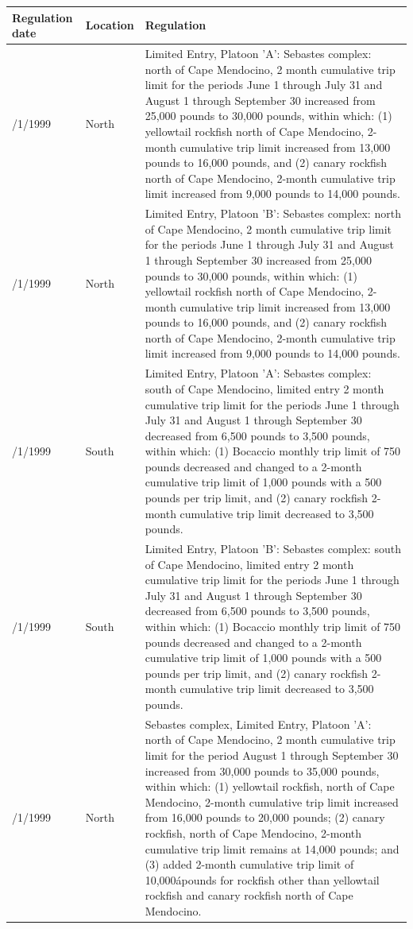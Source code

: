 \documentclass[12pt,]{article}
\begin{document}
\begin{tabular}{>{\centering}p{.60in}>{\centering}p{1.0in}>{\raggedright}p{4.20in}}
  \hline
Regulation date & Location & Regulation \\ 
  \hline
6/1/1999 & 4030 North & Limited Entry, Platoon 'A': Sebastes complex: north of Cape Mendocino, 2 month cumulative trip limit for the periods June 1 through July 31 and August 1 through September 30 increased from 25,000 pounds to 30,000 pounds, within which: (1) yellowtail rockfish north of Cape Mendocino, 2-month cumulative trip limit increased from 13,000 pounds to 16,000 pounds, and (2) canary rockfish north of Cape Mendocino, 2-month cumulative trip limit increased from 9,000 pounds to 14,000 pounds. \\ 
  6/1/1999 & 4030 North & Limited Entry, Platoon 'B': Sebastes complex: north of Cape Mendocino, 2 month cumulative trip limit for the periods June 1 through July 31 and August 1 through September 30 increased from 25,000 pounds to 30,000 pounds, within which: (1) yellowtail rockfish north of Cape Mendocino, 2-month cumulative trip limit increased from 13,000 pounds to 16,000 pounds, and (2) canary rockfish north of Cape Mendocino, 2-month cumulative trip limit increased from 9,000 pounds to 14,000 pounds. \\ 
  6/1/1999 & 4030 South & Limited Entry, Platoon 'A':  Sebastes complex: south of Cape Mendocino, limited entry 2 month cumulative trip limit for the periods June 1 through July 31 and August 1 through September 30 decreased from 6,500 pounds to 3,500 pounds, within which: (1) Bocaccio monthly trip limit of 750 pounds decreased and changed to a 2-month cumulative trip limit of 1,000 pounds with a 500 pounds per trip limit, and (2) canary rockfish 2-month cumulative trip limit decreased to 3,500 pounds. \\ 
  6/1/1999 & 4030 South & Limited Entry, Platoon 'B':  Sebastes complex: south of Cape Mendocino, limited entry 2 month cumulative trip limit for the periods June 1 through July 31 and August 1 through September 30 decreased from 6,500 pounds to 3,500 pounds, within which: (1) Bocaccio monthly trip limit of 750 pounds decreased and changed to a 2-month cumulative trip limit of 1,000 pounds with a 500 pounds per trip limit, and (2) canary rockfish 2-month cumulative trip limit decreased to 3,500 pounds. \\ 
  8/1/1999 & 4030 North & Sebastes complex, Limited Entry, Platoon 'A': north of Cape Mendocino, 2 month cumulative trip limit for the period August 1 through September 30 increased from 30,000 pounds to 35,000 pounds, within which: (1) yellowtail rockfish, north of Cape Mendocino, 2-month cumulative trip limit increased from 16,000 pounds to 20,000 pounds; (2) canary rockfish, north of Cape Mendocino, 2-month cumulative trip limit remains at 14,000 pounds; and (3) added 2-month cumulative trip limit of 10,000ápounds for rockfish other than yellowtail rockfish and canary rockfish north of Cape Mendocino. \\ 

\end{tabular}
\end{document}

